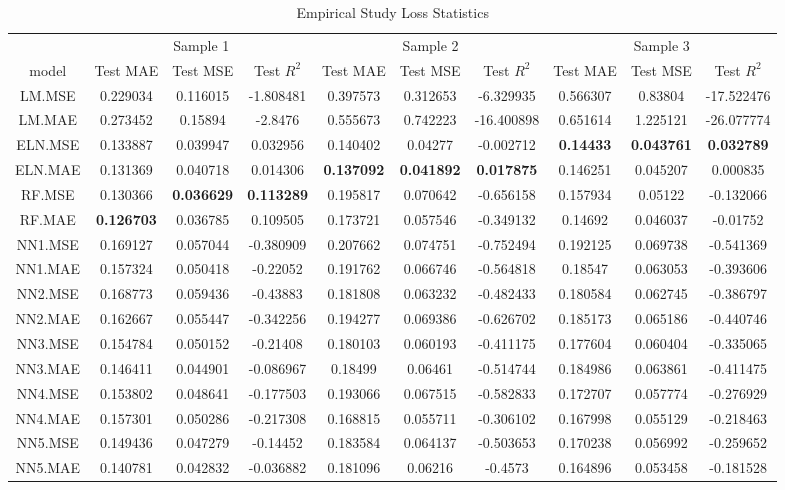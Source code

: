 \begin{table}

\caption{\label{tab:}Empirical Study Loss Statistics}
\centering
\fontsize{6}{8}\selectfont
\begin{tabular}[t]{cccccccccc}
\toprule
\multicolumn{1}{c}{ } & \multicolumn{3}{c}{Sample 1} & \multicolumn{3}{c}{Sample 2} & \multicolumn{3}{c}{Sample 3} \\
\cmidrule(l{3pt}r{3pt}){2-4} \cmidrule(l{3pt}r{3pt}){5-7} \cmidrule(l{3pt}r{3pt}){8-10}
model & Test MAE & Test MSE & Test $R^2$ & Test MAE & Test MSE & Test $R^2$ & Test MAE & Test MSE & Test $R^2$\\
\midrule
LM.MSE & 0.229034 & 0.116015 & -1.808481 & 0.397573 & 0.312653 & -6.329935 & 0.566307 & 0.83804 & -17.522476\\
LM.MAE & 0.273452 & 0.15894 & -2.8476 & 0.555673 & 0.742223 & -16.400898 & 0.651614 & 1.225121 & -26.077774\\
ELN.MSE & 0.133887 & 0.039947 & 0.032956 & 0.140402 & 0.04277 & -0.002712 & \textbf{0.14433} & \textbf{0.043761} & \textbf{0.032789}\\
ELN.MAE & 0.131369 & 0.040718 & 0.014306 & \textbf{0.137092} & \textbf{0.041892} & \textbf{0.017875} & 0.146251 & 0.045207 & 0.000835\\
RF.MSE & 0.130366 & \textbf{0.036629} & \textbf{0.113289} & 0.195817 & 0.070642 & -0.656158 & 0.157934 & 0.05122 & -0.132066\\
\addlinespace
RF.MAE & \textbf{0.126703} & 0.036785 & 0.109505 & 0.173721 & 0.057546 & -0.349132 & 0.14692 & 0.046037 & -0.01752\\
NN1.MSE & 0.169127 & 0.057044 & -0.380909 & 0.207662 & 0.074751 & -0.752494 & 0.192125 & 0.069738 & -0.541369\\
NN1.MAE & 0.157324 & 0.050418 & -0.22052 & 0.191762 & 0.066746 & -0.564818 & 0.18547 & 0.063053 & -0.393606\\
NN2.MSE & 0.168773 & 0.059436 & -0.43883 & 0.181808 & 0.063232 & -0.482433 & 0.180584 & 0.062745 & -0.386797\\
NN2.MAE & 0.162667 & 0.055447 & -0.342256 & 0.194277 & 0.069386 & -0.626702 & 0.185173 & 0.065186 & -0.440746\\
\addlinespace
NN3.MSE & 0.154784 & 0.050152 & -0.21408 & 0.180103 & 0.060193 & -0.411175 & 0.177604 & 0.060404 & -0.335065\\
NN3.MAE & 0.146411 & 0.044901 & -0.086967 & 0.18499 & 0.06461 & -0.514744 & 0.184986 & 0.063861 & -0.411475\\
NN4.MSE & 0.153802 & 0.048641 & -0.177503 & 0.193066 & 0.067515 & -0.582833 & 0.172707 & 0.057774 & -0.276929\\
NN4.MAE & 0.157301 & 0.050286 & -0.217308 & 0.168815 & 0.055711 & -0.306102 & 0.167998 & 0.055129 & -0.218463\\
NN5.MSE & 0.149436 & 0.047279 & -0.14452 & 0.183584 & 0.064137 & -0.503653 & 0.170238 & 0.056992 & -0.259652\\
\addlinespace
NN5.MAE & 0.140781 & 0.042832 & -0.036882 & 0.181096 & 0.06216 & -0.4573 & 0.164896 & 0.053458 & -0.181528\\
\bottomrule
\end{tabular}
\end{table}